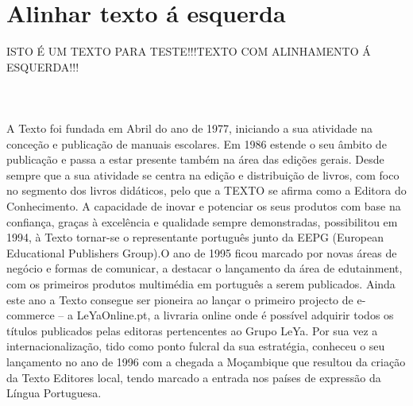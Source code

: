 \documentclass[a4paper,11pt]{report}%
\begin{document}
\section{Alinhar texto á esquerda}
\begin{flushleft}
ISTO É UM TEXTO PARA TESTE!!!\newline TEXTO COM ALINHAMENTO Á ESQUERDA!!!\newline \paragraph{\ \ }
A Texto foi fundada em Abril do ano de 1977, iniciando a sua atividade na conceção e publicação de manuais escolares. Em 1986 estende o seu âmbito de publicação e passa a estar presente também na área das edições gerais. Desde sempre que a sua atividade se centra na edição e distribuição de livros, com foco no segmento dos livros didáticos, pelo que a TEXTO se afirma como a Editora do Conhecimento. A capacidade de inovar e potenciar os seus produtos com base na confiança, graças à excelência e qualidade sempre demonstradas, possibilitou em 1994, à Texto tornar-se o representante português junto da EEPG (European Educational Publishers Group).O ano de 1995 ficou marcado por novas áreas de negócio e formas de comunicar, a destacar o lançamento da área de edutainment, com os primeiros produtos multimédia em português a serem publicados. Ainda este ano a Texto consegue ser pioneira ao lançar o primeiro projecto de e-commerce – a LeYaOnline.pt, a livraria online onde é possível adquirir todos os títulos publicados pelas editoras pertencentes ao Grupo LeYa. Por sua vez a internacionalização, tido como ponto fulcral da sua estratégia, conheceu o seu lançamento no ano de 1996 com a chegada a Moçambique que resultou da criação da Texto Editores local, tendo marcado a entrada nos países de expressão da Língua Portuguesa.
\end{flushleft}


\newpage
\end{document}
